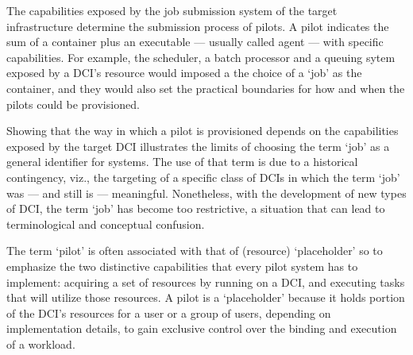 \documentclass{sig-alternate}
\begin{document}
The capabilities exposed by the job submission system of the target
infrastructure determine the submission process of pilots. A pilot
indicates the sum of a container plus an executable --- usually called
agent --- with  specific capabilities.
For example,  the scheduler, a
batch processor and a queuing  sytem exposed by a DCI's resource would
imposed a the choice of a `job' as the \pilot container, and they would
also set the practical boundaries for how and when the pilots could be
provisioned.


Showing that the way in which a pilot is provisioned depends on the
capabilities exposed by the target DCI illustrates the limits of
choosing the term `job' as a general identifier for \pilotjob systems.
The use of that term is due to a historical contingency, viz., the
targeting of a specific class of DCIs in which the term `job' was ---
and still is --- meaningful. Nonetheless, with the development of new
types of DCI, the term `job' has become too restrictive, a situation
that can lead to terminological and conceptual confusion.

The term `pilot' is often associated with that of (resource)
`placeholder' so to emphasize the two distinctive capabilities that
every pilot system has to implement: acquiring a set of resources by
running on a DCI, and executing tasks that will utilize those resources.
A pilot is a `placeholder' because it holds portion of the DCI's
resources for a user or a group of users, depending on implementation
details, to gain exclusive control over the binding and execution of a
workload.
\end{document}
